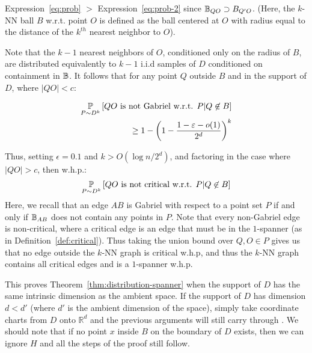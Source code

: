 Expression~\ref{eq:prob} $>$
Expression~\ref{eq:prob-2} since $\mathbb{B}_{QO} \supset B_{Q'O}$.
(Here, the $k$-NN ball $B$ w.r.t. point $O$ is defined as the ball
centered at $O$ with radius equal to the distance of the $k^{th}$
nearest neighbor to $O$).

Note that the $k-1$ nearest neighbors of $O$, conditioned only on
the radius of $B$, are distributed
equivalently to $k-1$ i.i.d samples of $D$ conditioned on containment
in $\mathbb{B}$. It follows
that for any point $Q$ outside $B$ and in the support of $D$,
where $|QO|< c$:

\begin{align*}
  \operatorname*{\mathbb{P}}_{P \sim D^k}\left[ QO \text{ is not Gabriel w.r.t. $P$} | Q \not\in B \right]\\
  \geq 1- \left(1 - \frac{1-\varepsilon-o(1) }{2^d} \right)^k
\end{align*}

Thus, setting $\epsilon = 0.1$ and $ k > O(\log n/2^d) $, and
factoring in the case where $|QO| > c$, then w.h.p.:
\[
  \operatorname*{\mathbb{P}}_{P \sim D^k}\left[ QO \text{ is not critical w.r.t. $P$} | Q \not\in B \right]
  \]
Here, we recall that an edge $AB$ is Gabriel with respect to a
point set $P$ if and only if $\mathbb{B}_{AB}$ does not contain any points
in $P$. Note that every non-Gabriel edge is non-critical, where a
critical edge is an edge that must be in the $1$-spanner (as
in Definition~\ref{def:critical}).
 Thus taking the union bound over $Q, O \in P$ gives us that
no edge outside the $k$-NN graph is critical w.h.p, and thus the
$k$-NN graph contains all critical edges and is a $1$-spanner
w.h.p.

This proves Theorem~\ref{thm:distribution-spanner} when the
support of $D$ has the same intrinsic dimension as the ambient
space. If the support of $D$ has  dimension $d < d'$ (where $d'$
is the ambient dimension of the space), simply take coordinate charts from
$D$ onto $\mathbb{R}^d$ and the previous arguments will still
carry through
.
We should note that if no point $x$ inside $B$ on the boundary of
$D$ exists, then we can ignore $H$ and all the steps of
the proof still follow.
